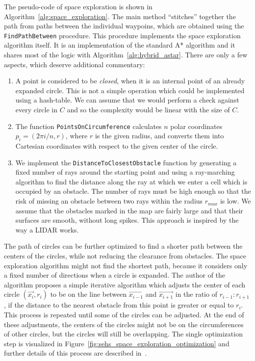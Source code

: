 The pseudo-code of space exploration is shown in Algorithm~\ref{alg:space_exploration}. The main method ``stitches'' together the path from paths between the individual waypoins, which are obtained using the \texttt{FindPathBetween} procedure. This procedure implements the space exploration algorithm itself. It is an implementation of the standard A* algorithm and it shares most of the logic with Algorithm~\ref{alg:hybrid_astar}. There are only a few aspects, which deserve additional commentary:

\begin{enumerate}
	\item A point is considered to be \textit{closed}, when it is an internal point of an already expanded circle. This is not a simple operation which could be implemented using a hash-table. We can assume that we would perform a check against every circle in $C$ and so the complexity would be linear with the size of $C$.
	
	\item The function \texttt{PointsOnCircumference} calculates $n$ polar coordinates $p_i=(2\pi i/n, r)$, where $r$ is the given radius, and converts them into Cartesian coordinates with respect to the given center of the circle.
	
	\item We implement the \texttt{DistanceToClosestObstacle} function by generating a fixed number of rays around the starting point and using a ray-marching algorithm to find the distance along the ray at which we enter a cell which is occupied by an obstacle. The number of rays must be high enough so that the risk of missing an obstacle between two rays within the radius $r_{max}$ is low. We assume that the obstacles marked in the map are fairly large and that their surfaces are smooth, without long spikes. This approach is inspired by the way a \gls{LIDAR} works.
\end{enumerate}

The path of circles can be further optimized to find a shorter path between the centers of the circles, while not reducing the clearance from obstacles. The space exploration algorithm might not find the shortest path, because it considers only a fixed number of directions when a circle is expanded. The author of the algorithm proposes a simple iterative algorithm which adjusts the center of each circle $(\vec{x_i}, r_i)$ to be on the line between $\vec{x_{i-1}}$ and $\vec{x_{i+1}}$ in the ratio of $r_{i-1}:r_{i+1}$, if the distance to the nearest obstacle from this point is greater or equal to $r_i$. This process is repeated until some of the circles can be adjusted. At the end of these adjustments, the centers of the circles might not be on the circumferences of other circles, but the circles will still be overlapping. The single optimization step is visualized in Figure~\ref{fig:sehs_space_exploration_optimization} and further details of this process are described in~\cite[Section 2.2.3]{SEHS}.

